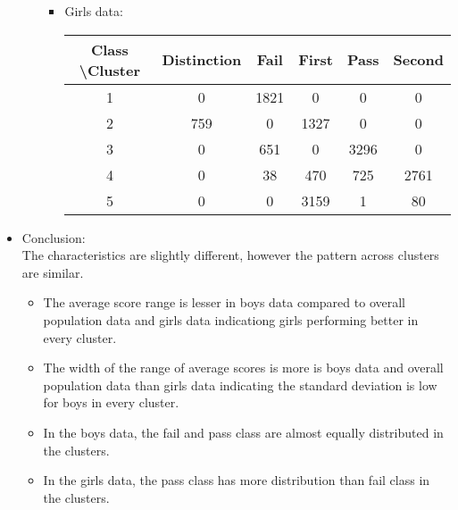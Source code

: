 \begin{itemize}
\begin{itemize}
\begin{itemize}
			\item
			Girls data: 
			\begin{center}
		    \begin{tabular}{ | c | c | c | c | c | c |}
		    \hline
			   	 Class \textbackslash Cluster & 	Distinction  & Fail  & First & Pass  & Second \\ 	\hline
						  1     &      0 & 1821 &    0 &   0  &    0 \\ 	\hline
						  2     &    759 &   0  & 1327 &   0  &    0 \\ 	\hline
						  3     &      0 & 651  &   0  & 3296 &    0 \\ 	\hline
						  4     &      0 &  38  & 470  & 725  & 2761 \\ 	\hline
						  5     &      0 &   0  & 3159 &   1  &   80 \\ 	\hline
				\end{tabular}
			\end{center}
		\end{itemize}
	\end{itemize}
	
	\item
	Conclusion:\\
	The characteristics are slightly different, however the pattern across clusters are similar.
	\begin{itemize}
		\item
		The average score range is lesser in boys data compared to overall population data and girls data indicationg girls performing better in every cluster.
		\item
		The width of the range of average scores is more is boys data and overall population data than girls data indicating the standard deviation is low for boys in every cluster.
		\item
		In the boys data, the fail and pass class are almost equally distributed in the clusters.
		\item
		In the girls data, the pass class has more distribution than fail class in the clusters.
	\end{itemize}
\end{itemize}
